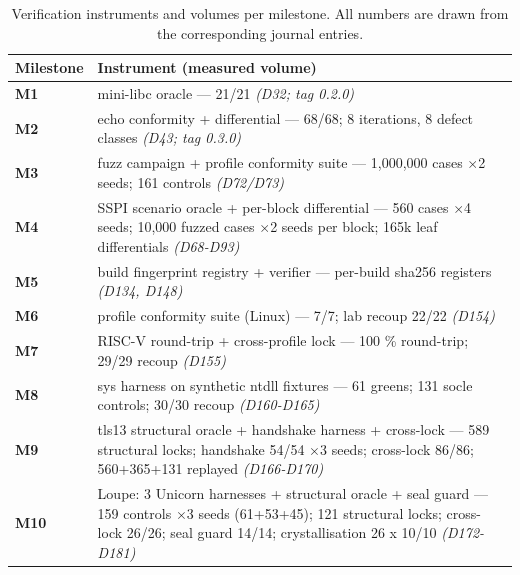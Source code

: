 \begin{table}[htbp]\centering\footnotesize
\caption{Verification instruments and volumes per milestone. All numbers are drawn from the corresponding journal entries.}
\label{tab:oracles}
\begin{tabularx}{\textwidth}{@{}l X@{}}
\toprule
\textbf{Milestone} & \textbf{Instrument (measured volume)} \\
\midrule
\textbf{M1} & mini-libc oracle — 21/21 \emph{(D32; tag 0.2.0)} \\
\textbf{M2} & echo conformity + differential — 68/68; 8 iterations, 8 defect classes \emph{(D43; tag 0.3.0)} \\
\textbf{M3} & fuzz campaign + profile conformity suite — 1,000,000 cases $\times$2 seeds; 161 controls \emph{(D72/D73)} \\
\textbf{M4} & SSPI scenario oracle + per-block differential — 560 cases $\times$4 seeds; 10,000 fuzzed cases $\times$2 seeds per block; 165k leaf differentials \emph{(D68-D93)} \\
\textbf{M5} & build fingerprint registry + verifier — per-build sha256 registers \emph{(D134, D148)} \\
\textbf{M6} & profile conformity suite (Linux) — 7/7; lab recoup 22/22 \emph{(D154)} \\
\textbf{M7} & RISC-V round-trip + cross-profile lock — 100 \% round-trip; 29/29 recoup \emph{(D155)} \\
\textbf{M8} & sys harness on synthetic ntdll fixtures — 61 greens; 131 socle controls; 30/30 recoup \emph{(D160-D165)} \\
\textbf{M9} & tls13 structural oracle + handshake harness + cross-lock — 589 structural locks; handshake 54/54 $\times$3 seeds; cross-lock 86/86; 560+365+131 replayed \emph{(D166-D170)} \\
\textbf{M10} & Loupe: 3 Unicorn harnesses + structural oracle + seal guard — 159 controls $\times$3 seeds (61+53+45); 121 structural locks; cross-lock 26/26; seal guard 14/14; crystallisation 26 x 10/10 \emph{(D172-D181)} \\
\bottomrule
\end{tabularx}\end{table}

